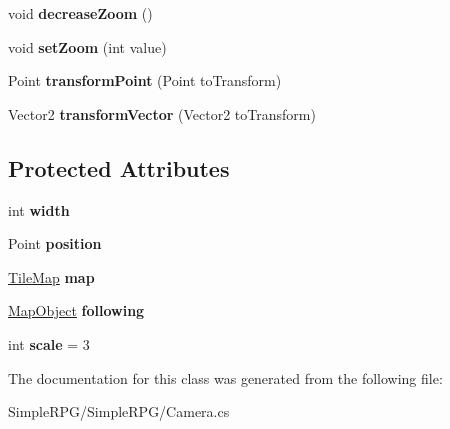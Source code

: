 \begin{DoxyCompactItemize}
\item 
\hypertarget{class_simple_r_p_g_1_1_camera_a5a97dec2fa082efa5b3d58ac96d04af3}{void {\bfseries decrease\-Zoom} ()}\label{class_simple_r_p_g_1_1_camera_a5a97dec2fa082efa5b3d58ac96d04af3}

\item 
\hypertarget{class_simple_r_p_g_1_1_camera_a8822f4b9d972bd6c4cf21d0c1c74ee1f}{void {\bfseries set\-Zoom} (int value)}\label{class_simple_r_p_g_1_1_camera_a8822f4b9d972bd6c4cf21d0c1c74ee1f}

\item 
\hypertarget{class_simple_r_p_g_1_1_camera_a2a951b7efa483bf5dc78048d2facf405}{Point {\bfseries transform\-Point} (Point to\-Transform)}\label{class_simple_r_p_g_1_1_camera_a2a951b7efa483bf5dc78048d2facf405}

\item 
\hypertarget{class_simple_r_p_g_1_1_camera_ae9d692e884e118f3d9dd7a7b0b0272cf}{Vector2 {\bfseries transform\-Vector} (Vector2 to\-Transform)}\label{class_simple_r_p_g_1_1_camera_ae9d692e884e118f3d9dd7a7b0b0272cf}

\end{DoxyCompactItemize}
\subsection*{Protected Attributes}
\begin{DoxyCompactItemize}
\item 
\hypertarget{class_simple_r_p_g_1_1_camera_ab0fea3d111b817fcb7f838b4648c4657}{int {\bfseries width}}\label{class_simple_r_p_g_1_1_camera_ab0fea3d111b817fcb7f838b4648c4657}

\item 
\hypertarget{class_simple_r_p_g_1_1_camera_ae1387580f2a0ebd55db53956c6dd13e5}{Point {\bfseries position}}\label{class_simple_r_p_g_1_1_camera_ae1387580f2a0ebd55db53956c6dd13e5}

\item 
\hypertarget{class_simple_r_p_g_1_1_camera_a1641f20a80724c541768c011ad2764dd}{\hyperlink{class_simple_r_p_g_1_1_tile_map}{Tile\-Map} {\bfseries map}}\label{class_simple_r_p_g_1_1_camera_a1641f20a80724c541768c011ad2764dd}

\item 
\hypertarget{class_simple_r_p_g_1_1_camera_aca69b516daceee441b7720ada3c332e4}{\hyperlink{class_simple_r_p_g_1_1_map_object}{Map\-Object} {\bfseries following}}\label{class_simple_r_p_g_1_1_camera_aca69b516daceee441b7720ada3c332e4}

\item 
\hypertarget{class_simple_r_p_g_1_1_camera_a107cbdb4e731179affca5292ea1b2a4a}{int {\bfseries scale} = 3}\label{class_simple_r_p_g_1_1_camera_a107cbdb4e731179affca5292ea1b2a4a}

\end{DoxyCompactItemize}


The documentation for this class was generated from the following file\-:\begin{DoxyCompactItemize}
\item 
Simple\-R\-P\-G/\-Simple\-R\-P\-G/Camera.\-cs\end{DoxyCompactItemize}
